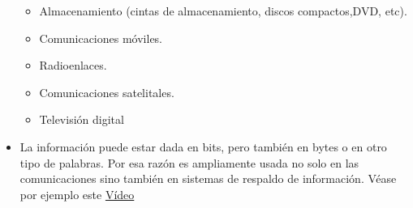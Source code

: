 \begin{itemize}
 \begin{itemize}
 \item Almacenamiento (cintas de almacenamiento, discos compactos,DVD, etc).
 \item Comunicaciones móviles.
 \item Radioenlaces.
 \item Comunicaciones satelitales.
 \item Televisión digital
 \end{itemize}
 
 \item  La información puede estar dada en bits, pero también en bytes o en otro tipo de palabras. Por esa razón es ampliamente usada no solo en las comunicaciones sino también en sistemas de respaldo de información. Véase por ejemplo este \textcolor{blue}{\href{https://www.youtube.com/watch?v=jgO09opx56o}{Vídeo }}
\end{itemize}


